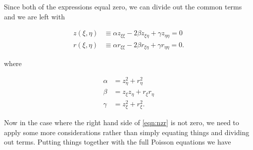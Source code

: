 Since both of the expressions equal zero, we can divide out the common terms and we are left with

\begin{subequations}
	\begin{align}
        z(\xi,\eta)	&\equiv \alpha z_{\xi\xi} - 2\beta z_{\xi\eta} + \gamma z_{\eta\eta} = 0 \\
        r(\xi,\eta)	&\equiv \alpha r_{\xi\xi} - 2\beta r_{\xi\eta} + \gamma r_{\eta\eta} = 0.
	\end{align}
\end{subequations}

\noindent where

\begin{subequations}
	\begin{align}
		\alpha &= z_\eta^2 + r_\eta^2 \\
		\beta &= z_\xi z_\eta + r_\xi r_\eta \\
		\gamma &= z_\xi^2 + r_\xi^2.
	\end{align}
\end{subequations}

Now in the case where the right hand side of \cref{eqn:nzr} is not zero, we need to apply some more considerations rather than simply equating things and dividing out terms.
%
Putting things together with the full Poisson equations we have

